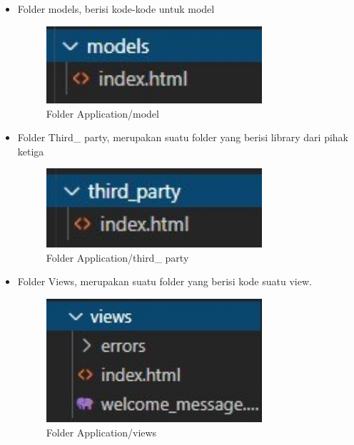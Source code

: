 \begin{itemize}
\begin{itemize}
\begin{itemize}
			\item Folder models, berisi kode-kode untuk model
			\begin{figure}[H]
				\includegraphics[width=8cm]{figures/instalasi/ci24.jpg}
				\centering
				\caption{Folder Application/model}
			\end{figure}	
	
			\item Folder Third\_ party, merupakan suatu folder yang berisi library dari pihak ketiga
			\begin{figure}[H]
				\includegraphics[width=8cm]{figures/instalasi/ci25.jpg}
				\centering
				\caption{Folder Application/third\_ party}
			\end{figure}	
	
			\item Folder Views, merupakan suatu folder yang berisi kode suatu view.
			\begin{figure}[H]
				\includegraphics[width=8cm]{figures/instalasi/ci26.jpg}
				\centering
				\caption{Folder Application/views}
			\end{figure}	
		\end{itemize}
		

\end{itemize}
\end{itemize}
